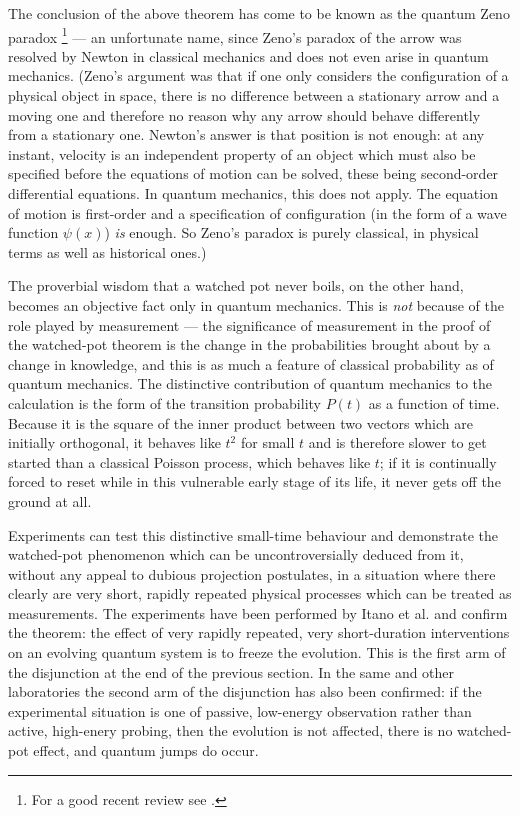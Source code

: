 \documentclass[12pt,a4paper,reqno]{article}
\renewcommand{\(}{\left(}
\renewcommand{\)}{\right)}
\newcommand{\<}{\langle}
\renewcommand{\>}{\rangle}
\theoremstyle{plain} %
\theoremstyle{definition}
\theoremstyle{remark}
\begin{document}
The conclusion of the above theorem has come to be known as the quantum 
Zeno paradox \footnote{For a good recent
review see \cite{Whitaker:PQE}.} --- an unfortunate name, since Zeno's paradox of the arrow 
was resolved by Newton in classical mechanics and does not even arise 
in quantum mechanics. (Zeno's argument was that if one only considers 
the configuration of a physical object in space, there is no difference 
between a stationary arrow and a moving one and therefore no reason why 
any arrow should behave differently from a stationary one. Newton's answer 
is that position is not enough: at any instant, velocity is an independent 
property of an object which must also be specified before the equations 
of motion can be solved, these being second-order differential equations. 
In quantum mechanics, this does not apply. 
The equation of motion is first-order and a specification 
of configuration (in the form of a wave function $\psi (x)$) {\em is} enough. 
So Zeno's paradox is purely classical, in physical terms as well as historical 
ones.)

The proverbial wisdom that a watched pot never boils, on the other 
hand, becomes an objective fact only in quantum mechanics. This is {\em 
not} because of the role played by measurement --- the significance of 
measurement in the proof of the watched-pot theorem is the change in the 
probabilities brought about by a change in knowledge, and this is as much 
a feature of classical probability as of quantum mechanics. The distinctive 
contribution of quantum mechanics to the calculation is the form of the 
transition probability $P(t)$ as a function of time. Because it is the 
square of the inner product between two vectors which are initially orthogonal, 
it behaves like $t^2$ for small $t$ and is therefore slower to get started 
than a classical Poisson process, which behaves like $t$; if it is continually 
forced to reset while in this vulnerable early stage of its life, it never 
gets off the ground at all.

Experiments can test this distinctive small-time behaviour and
demonstrate the watched-pot phenomenon which can be uncontroversially
deduced from it, without any appeal to dubious projection postulates,
in a situation where there clearly are very short, rapidly repeated
physical processes which can be treated as measurements. The
experiments have been performed by Itano et al. \cite{watched-pot:expt} and
confirm the theorem: the effect of very rapidly repeated, very
short-duration interventions on an evolving quantum system is to freeze
the evolution. This is the first arm of the disjunction at the end of
the previous section. In the same and other laboratories the second arm of the
disjunction has also been confirmed: if the experimental situation is
one of passive, low-energy observation rather than active, high-enery
probing, then the evolution is not affected, there is no watched-pot
effect, and quantum jumps do occur. 
\end{document}
